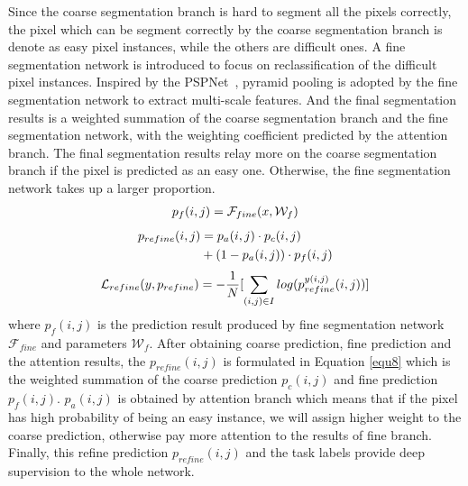 \documentclass[10.5pt,compsoc]{TsT}
\newcommand{\upcite}[1]{\superscript{\textsuperscript{\cite{#1}}}}
\theoremstyle{mystyle}
\newcommand{\upcite}[1]{\textsuperscript{\cite{#1}}}
\begin{document}
{Since the coarse segmentation branch is hard to segment all the pixels correctly, the pixel which can be segment correctly by the coarse segmentation branch is denote as easy pixel instances, while the others are difficult ones.
A fine segmentation network is introduced to focus on reclassification of the difficult pixel instances. Inspired by the PSPNet~\upcite{21}, pyramid pooling is adopted by the fine segmentation network to extract multi-scale features. And the final segmentation results is a weighted summation of the coarse segmentation branch and the fine segmentation network, with the weighting coefficient predicted by the attention branch. The final segmentation results relay more on the coarse segmentation branch if the pixel is predicted as an easy one. Otherwise, the fine segmentation network takes up a larger proportion. 
\begin{equation}\label{equ7}
\setlength\abovedisplayskip{8pt}
\setlength\belowdisplayskip{8pt}
\begin{split}
p_{f}(i,j) = \mathcal{F}_{fine}(x, \mathcal{W}_f)\\
\end{split}
\end{equation}
\begin{equation}\label{equ8}
\setlength\abovedisplayskip{8pt}
\setlength\belowdisplayskip{8pt}
\begin{split}
p_{refine}(i,j) &= p_{a}(i,j) \cdot p_{c}(i,j)\\
&+ (1-p_{a}(i,j)) \cdot p_{f}(i,j)\\
\end{split}
\end{equation}
\begin{equation}\label{equ9}
\setlength\abovedisplayskip{8pt}
\setlength\belowdisplayskip{8pt}
\begin{split}
\mathcal{L}_{refine}(y, p_{refine}) = - \frac{1}{N}[\sum_{(i,j)\in I}log(p^{y(i,j)}_{refine}(i,j))]\\
\end{split}
\end{equation}
where $p_{f}(i,j)$ is the prediction result produced by fine segmentation network $\mathcal{F}_{fine}$ and parameters $\mathcal{W}_f$. After obtaining coarse prediction, fine prediction and the attention results, the $p_{refine}(i,j)$ is formulated in Equation \ref{equ8} which is the weighted  summation of the coarse prediction $p_{c}(i,j)$ and fine prediction $p_{f}(i,j)$. $p_{a}(i,j)$ is obtained by attention branch which means that if the pixel has high probability of being an easy instance, we will assign higher weight to the coarse prediction, otherwise pay more attention to the results of fine branch. Finally, this refine prediction $p_{refine}(i,j)$ and the task labels provide deep supervision to the whole network.

}
\end{document}
